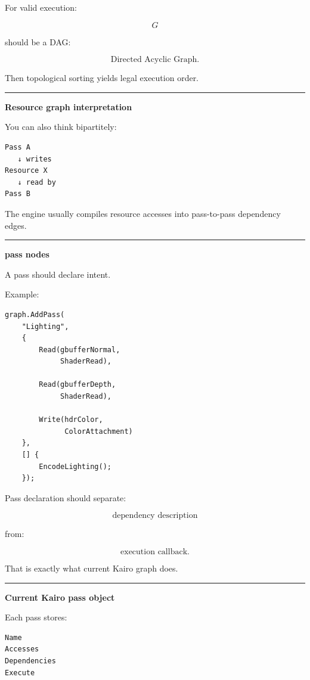 For valid execution:

\[
G
\]

should be a DAG:

\[
\boxed{
\text{Directed Acyclic Graph}.
}
\]

Then topological sorting yields legal execution order.

\begin{center}\rule{0.5\linewidth}{0.5pt}\end{center}

\textbf{Resource graph interpretation}

You can also think bipartitely:

\begin{verbatim}
Pass A
   ↓ writes
Resource X
   ↓ read by
Pass B
\end{verbatim}

The engine usually compiles resource accesses into pass-to-pass dependency edges.

\begin{center}\rule{0.5\linewidth}{0.5pt}\end{center}

\textbf{pass nodes}

A pass should declare intent.

Example:

\begin{verbatim}
graph.AddPass(
    "Lighting",
    {
        Read(gbufferNormal,
             ShaderRead),

        Read(gbufferDepth,
             ShaderRead),

        Write(hdrColor,
              ColorAttachment)
    },
    [] {
        EncodeLighting();
    });
\end{verbatim}

Pass declaration should separate:

\[
\boxed{
\text{dependency description}
}
\]

from:

\[
\boxed{
\text{execution callback}.
}
\]

That is exactly what current Kairo graph does.

\begin{center}\rule{0.5\linewidth}{0.5pt}\end{center}

\textbf{Current Kairo pass object}

Each pass stores:

\begin{verbatim}
Name
Accesses
Dependencies
Execute
\end{verbatim}

